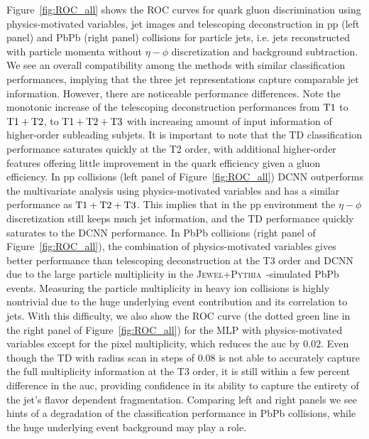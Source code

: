 \documentclass[notoc]{JHEP3}
\newcommand{\jwpy}{\textsc{Jewel+Pythia}~}
\begin{document}
Figure~\ref{fig:ROC_all} shows the ROC curves for quark gluon discrimination using physics-motivated variables, jet images and telescoping deconstruction in pp (left panel) and PbPb (right panel) collisions for particle jets, i.e. jets reconstructed with particle momenta without $\eta-\phi$ discretization and background subtraction. We see an overall compatibility among the methods with similar classification performances, implying that the three jet representations capture comparable jet information. However, there are noticeable performance differences. Note the monotonic increase of the telescoping deconstruction performances from $\rm T1$ to $\rm T1+T2$, to $\rm T1+T2+T3$ with increasing amount of input information of higher-order subleading subjets. It is important to note that the TD classification performance saturates quickly at the T2 order, with additional higher-order features offering little improvement in the quark efficiency given a gluon efficiency. In pp collisions (left panel of Figure~\ref{fig:ROC_all}) DCNN outperforms the multivariate analysis using physics-motivated variables and has a similar performance as $\rm T1+T2+T3$. This implies that in the pp environment the $\eta-\phi$ discretization still keeps much jet information, and the TD performance quickly saturates to the DCNN performance. In PbPb collisions (right panel of Figure~\ref{fig:ROC_all}), the combination of physics-motivated variables gives better performance than telescoping deconstruction at the T3 order and DCNN due to the large particle multiplicity in the \jwpy-simulated PbPb events. %
Measuring the particle multiplicity in heavy ion collisions is highly nontrivial due to the huge underlying event contribution and its correlation to jets. With this difficulty, we also show the ROC curve (the dotted green line in the right panel of Figure~\ref{fig:ROC_all}) for the MLP with physics-motivated variables except for the pixel multiplicity, which reduces the auc by $0.02$. %
Even though the TD with radius scan in steps of 0.08 is not able to accurately capture the full multiplicity information at the T3 order, it is still within a few percent difference in the auc, providing confidence in its ability to capture the entirety of the jet's flavor dependent fragmentation. Comparing left and right panels we see hints of a degradation of the classification performance in PbPb collisions, while the huge underlying event background may play a role.
\end{document}
